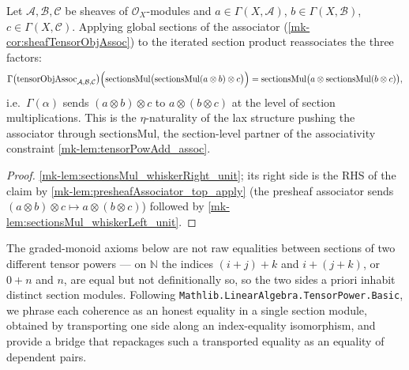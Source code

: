 \begin{lemma}\label{mk-lem:tensorObjAssoc_hom_sectionsMul}
  \leanok

  Let \(\mathcal{A}, \mathcal{B}, \mathcal{C}\) be sheaves of
  \(\mathcal{O}_X\)-modules and \(a \in \Gamma(X,\mathcal{A})\),
  \(b \in \Gamma(X,\mathcal{B})\), \(c \in \Gamma(X,\mathcal{C})\). Applying global
  sections of the associator (\ref{mk-cor:sheafTensorObjAssoc}) to the iterated
  section product reassociates the three factors:
  \[
    \Gamma\bigl(\mathrm{tensorObjAssoc}_{\mathcal{A},\mathcal{B},\mathcal{C}}\bigr)
      \Bigl(\mathrm{sectionsMul}\bigl(
        \mathrm{sectionsMul}(a \otimes b) \otimes c\bigr)\Bigr)
      = \mathrm{sectionsMul}\bigl(a \otimes \mathrm{sectionsMul}(b \otimes c)\bigr),
  \]
  i.e.\ \(\Gamma(\alpha)\) sends \((a \otimes b) \otimes c\) to
  \(a \otimes (b \otimes c)\) at the level of section multiplications. This is the
  \(\eta\)-naturality of the lax structure pushing the associator through
  \(\mathrm{sectionsMul}\), the section-level partner of the associativity
  constraint \ref{mk-lem:tensorPowAdd_assoc}.
\end{lemma}

\begin{proof}
  \leanok
  \ref{mk-lem:sectionsMul_whiskerRight_unit}; its right side is the RHS of the claim
  by \ref{mk-lem:presheafAssociator_top_apply} (the presheaf associator sends
  \((a \otimes b) \otimes c \mapsto a \otimes (b \otimes c)\)) followed by
  \ref{mk-lem:sectionsMul_whiskerLeft_unit}.
\end{proof}

The graded-monoid axioms below are not raw equalities between sections of two
different tensor powers --- on \(\mathbb{N}\) the indices \((i+j)+k\) and
\(i+(j+k)\), or \(0+n\) and \(n\), are equal but not definitionally so, so the two
sides a priori inhabit distinct section modules. Following
\texttt{Mathlib.LinearAlgebra.TensorPower.Basic}, we phrase each coherence as an
honest equality in a single section module, obtained by transporting one side
along an index-equality isomorphism, and provide a bridge that repackages such a
transported equality as an equality of dependent pairs.

